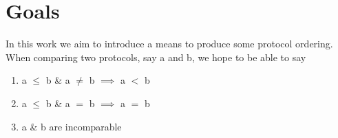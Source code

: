 \section{Goals}

In this work we aim to introduce a means to produce some protocol ordering. When comparing two protocols, say a and b, we hope to be able to say 

\begin{enumerate}
    \item a $\leq$ b \& a $\neq$ b $\implies$ a $<$ b
    \item a $\leq$ b \& a $=$ b $\implies$ a $=$ b
    \item a \& b are incomparable  
\end{enumerate}